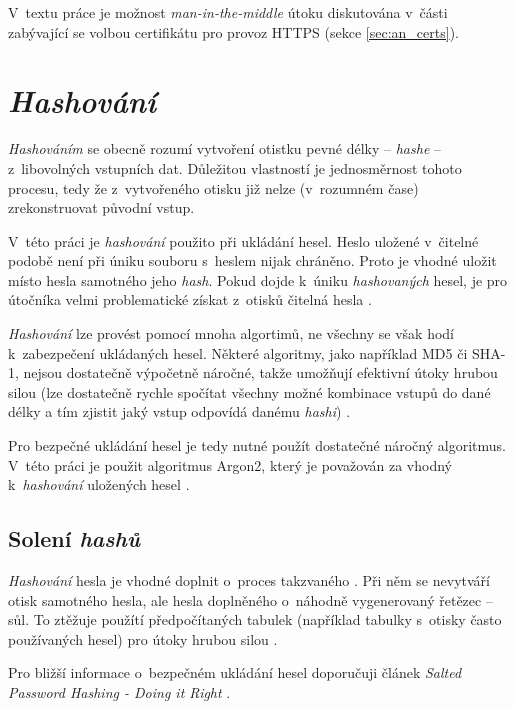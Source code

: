 V~textu práce je možnost \textit{man-in-the-middle} útoku diskutována v~části zabývající se volbou certifikátu pro provoz HTTPS (sekce \ref{sec:an_certs}).

\section{\textit{Hashování}}

\textit{Hashováním} se obecně rozumí vytvoření otistku pevné délky -- \textit{hashe} -- z~libovolných vstupních dat. Důležitou vlastností je jednosměrnost tohoto procesu, tedy že z~vytvořeného otisku již nelze (v~rozumném čase) zrekonstruovat původní vstup. \cite{hash_crackstation}

V~této práci je \textit{hashování} použito při ukládání hesel. Heslo uložené v~čitelné podobě není při úniku souboru s~heslem nijak chráněno. Proto je vhodné uložit místo hesla samotného jeho \textit{hash}. Pokud dojde k~úniku \textit{hashovaných} hesel, je pro útočníka velmi problematické získat z~otisků čitelná hesla \cite{hash_crackstation}.

\textit{Hashování} lze provést pomocí mnoha algortimů, ne všechny se však hodí k~zabezpečení ukládaných hesel. Některé algoritmy, jako například MD5 či SHA-1, nejsou dostatečně výpočetně náročné, takže umožňují efektivní útoky hrubou silou (lze dostatečně rychle spočítat všechny možné kombinace vstupů do dané délky a tím zjistit jaký vstup odpovídá danému \textit{hashi}) \cite{hash_crackstation}. 

Pro bezpečné ukládání hesel je tedy nutné použít dostatečné náročný algoritmus. V~této práci je použit algoritmus Argon2, který je považován za vhodný k~\textit{hashování} uložených hesel \cite{hash_crackstation}.

\subsection{Solení \textit{hashů}}

\textit{Hashování} hesla je vhodné doplnit o~proces takzvaného . Při něm se nevytváří otisk samotného hesla, ale hesla doplněného o~náhodně vygenerovaný řetězec -- sůl. To ztěžuje použítí předpočítaných tabulek (například tabulky s~otisky často používaných hesel) pro útoky hrubou silou \cite{hash_crackstation}.

Pro bližší informace o~bezpečném ukládání hesel doporučuji článek \textit{Salted Password Hashing - Doing it Right} \cite{hash_crackstation}.
